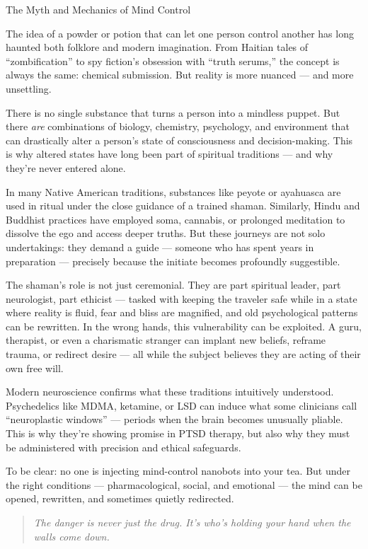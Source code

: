 \begin{PsychologicalSidebar}{The Myth and Mechanics of Mind Control}

  The idea of a powder or potion that can let one person control another has long haunted both folklore and modern 
  imagination. From Haitian tales of “zombification” to spy fiction's obsession with “truth serums,” the concept is 
  always the same: chemical submission. But reality is more nuanced — and more unsettling.

  \medskip
  
  There is no single substance that turns a person into a mindless puppet. But there \emph{are} combinations of biology, 
  chemistry, psychology, and environment that can drastically alter a person’s state of consciousness and decision-making. 
  This is why altered states have long been part of spiritual traditions — and why they’re never entered alone.

  \medskip
  
  In many Native American traditions, substances like peyote or ayahuasca are used in ritual under the close guidance of 
  a trained shaman. Similarly, Hindu and Buddhist practices have employed soma, cannabis, or prolonged meditation 
  to dissolve the ego and access deeper truths. But these journeys are not solo undertakings: they demand a guide — 
  someone who has spent years in preparation — precisely because the initiate becomes profoundly suggestible. 

  \medskip
  
  The shaman’s role is not just ceremonial. They are part spiritual leader, part neurologist, part ethicist — tasked with 
  keeping the traveler safe while in a state where reality is fluid, fear and bliss are magnified, and old psychological 
  patterns can be rewritten. In the wrong hands, this vulnerability can be exploited. A guru, therapist, or even a 
  charismatic stranger can implant new beliefs, reframe trauma, or redirect desire — all while the subject believes they 
  are acting of their own free will.

  \medskip
  
  Modern neuroscience confirms what these traditions intuitively understood. Psychedelics like MDMA, ketamine, or LSD 
  can induce what some clinicians call “neuroplastic windows” — periods when the brain becomes unusually pliable. This 
  is why they’re showing promise in PTSD therapy, but also why they must be administered with precision and ethical 
  safeguards. 

  \medskip
  
  To be clear: no one is injecting mind-control nanobots into your tea. But under the right conditions — pharmacological, 
  social, and emotional — the mind can be opened, rewritten, and sometimes quietly redirected.
  
  \begin{quote}
  \textit{The danger is never just the drug. It’s who’s holding your hand when the walls come down.}
  \end{quote}
  
\end{PsychologicalSidebar}

